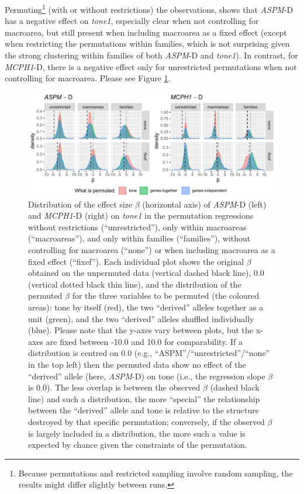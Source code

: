 \documentclass[twoside,onecolumn]{article}
\begin{document}
Permuting\footnote{Because permutations and restricted sampling involve random sampling, the results might differ slightly between runs.} (with or without restrictions) the observations, shows that \textit{ASPM}-D has a negative effect on \textit{tone1}, especially clear when not controlling for macroarea, but still present when including macroarea as a fixed effect (except when restricting the permutations within families, which is not surprising given the strong clustering within families of both \textit{ASPM}-D and \textit{tone1}).
In contrast, for \textit{MCPH1}-D, there is a negative effect only for unrestricted permutations when not controlling for macroarea.
Please see Figure \ref{Fig:tone1_regressions_permuted}.

\begin{figure}[h]
  \centering
  \includegraphics[width=\textwidth]{../../code/figures/tone1_regressions_permuted}
  \caption{Distribution of the effect size $\beta$ (horizontal axis) of \textit{ASPM}-D (left) and \textit{MCPH1}-D (right) on \textit{tone1} in the permutation regressions without restrictions (``unrestricted''), only within macroareas (``macroareas''), and only within families (``families''), without controlling for macroarea (``none'') or when including macroarea as a fixed effect (``fixef''). Each individual plot shows the original $\beta$ obtained on the unpermuted data (vertical dashed black line), 0.0 (vertical dotted black thin line), and the distribution of the permuted $\beta$ for the three variables to be permuted (the coloured areas): tone by itself (red), the two ``derived'' alleles together as a unit (green), and the two ``derived'' alleles shuffled individually (blue). Please note that the y-axes vary between plots, but the x-axes are fixed between -10.0 and 10.0 for comparability. If a distribution is centred on 0.0 (e.g., ``ASPM''/``unrestricted''/``none'' in the top left) then the permuted data show no effect of the ``derived'' allele (here, \textit{ASPM}-D) on tone (i.e., the regression slope $\beta$ is 0.0). The less overlap is between the observed $\beta$ (dashed black line) and such a distribution, the more ``special'' the relationship between the ``derived'' allele and tone is relative to the structure destroyed by that specific permutation; conversely, if the observed $\beta$ is largely included in a distribution, the more such a value is expected by chance given the constraints of the permutation.}
  \label{Fig:tone1_regressions_permuted}
\end{figure}
\end{document}
